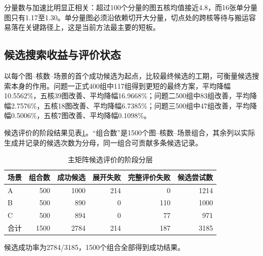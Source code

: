 分量数与加速比明显正相关：超过100个分量的图五核均值接近4.8，而16张单分量图只有1.17至1.30。单分量图必须沿依赖切开大分量，切点处的跨核等待与搬运容易落在关键路径上，这是当前方法最主要的短板。

\subsection{候选搜索收益与评价状态}
以每个图--核数--场景的首个成功候选为起点，比较最终候选的工期，可衡量候选搜索本身的作用。问题一正式400组中117组得到更短的最终方案，平均降幅10.5562\%，五核39图改善、平均降幅16.9668\%；问题二500组中83组改善，平均降幅2.7576\%，五核18图改善、平均降幅6.7385\%；问题三500组中47组改善，平均降幅0.5006\%，五核7图改善、平均降幅0.1098\%。

候选评价的阶段结果见表\ref{tab:candidate-status}。“组合数”是1500个图--核数--场景组合，其余列以实际生成并记录的候选次数为分母，同一组合可贡献多条候选记录。
\begin{table}[H]\centering\small
\caption{主矩阵候选评价的阶段分层}\label{tab:candidate-status}
\setlength{\tabcolsep}{4pt}
\begin{tabular}{lrrrrr}\toprule
场景 & 组合数 & 成功候选 & 展开失败 & 完整评价失败 & 候选尝试数\\\midrule
A & 500 & 1000 & 214 & 0 & 1214\\
B & 500 & 890 & 0 & 110 & 1000\\
C & 500 & 894 & 0 & 77 & 971\\\midrule
合计 & 1500 & 2784 & 214 & 187 & 3185\\\bottomrule
\end{tabular}
\end{table}
候选成功率为2784/3185，1500个组合全部得到成功结果。

